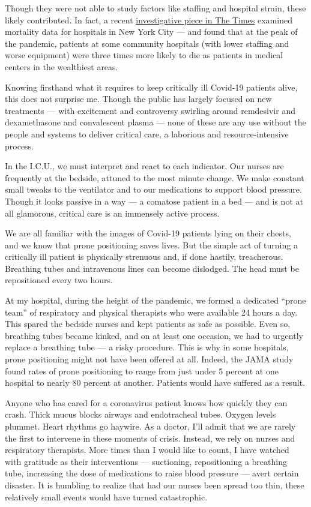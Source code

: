 Though they were not able to study factors like staffing and hospital
strain, these likely contributed. In fact, a recent
\href{https://www.nytimes.com/2020/07/01/nyregion/Coronavirus-hospitals.html}{investigative
piece in The Times} examined mortality data for hospitals in New York
City --- and found that at the peak of the pandemic, patients at some
community hospitals (with lower staffing and worse equipment) were three
times more likely to die as patients in medical centers in the
wealthiest areas.

Knowing firsthand what it requires to keep critically ill Covid-19
patients alive, this does not surprise me. Though the public has largely
focused on new treatments --- with excitement and controversy swirling
around remdesivir and dexamethasone and convalescent plasma --- none of
these are any use without the people and systems to deliver critical
care, a laborious and resource-intensive process.

In the I.C.U., we must interpret and react to each indicator. Our nurses
are frequently at the bedside, attuned to the most minute change. We
make constant small tweaks to the ventilator and to our medications to
support blood pressure. Though it looks passive in a way --- a comatose
patient in a bed --- and is not at all glamorous, critical care is an
immensely active process.

We are all familiar with the images of Covid-19 patients lying on their
chests, and we know that prone positioning saves lives. But the simple
act of turning a critically ill patient is physically strenuous and, if
done hastily, treacherous. Breathing tubes and intravenous lines can
become dislodged. The head must be repositioned every two hours.

At my hospital, during the height of the pandemic, we formed a dedicated
``prone team'' of respiratory and physical therapists who were available
24 hours a day. This spared the bedside nurses and kept patients as safe
as possible. Even so, breathing tubes became kinked, and on at least one
occasion, we had to urgently replace a breathing tube --- a risky
procedure. This is why in some hospitals, prone positioning might not
have been offered at all. Indeed, the JAMA study found rates of prone
positioning to range from just under 5 percent at one hospital to nearly
80 percent at another. Patients would have suffered as a result.

Anyone who has cared for a coronavirus patient knows how quickly they
can crash. Thick mucus blocks airways and endotracheal tubes. Oxygen
levels plummet. Heart rhythms go haywire. As a doctor, I'll admit that
we are rarely the first to intervene in these moments of crisis.
Instead, we rely on nurses and respiratory therapists. More times than I
would like to count, I have watched with gratitude as their
interventions --- suctioning, repositioning a breathing tube, increasing
the dose of medications to raise blood pressure --- avert certain
disaster. It is humbling to realize that had our nurses been spread too
thin, these relatively small events would have turned catastrophic.

